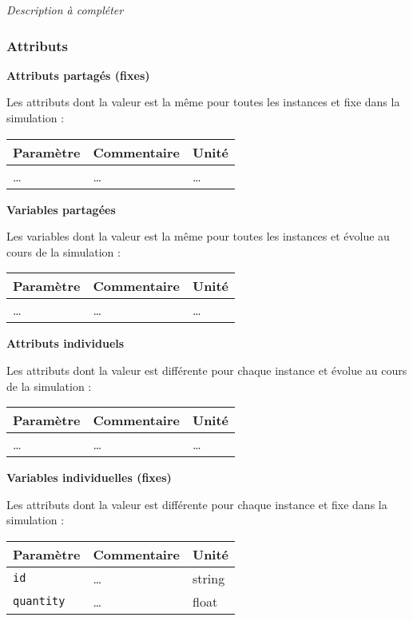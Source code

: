 \documentclass[
]{article}
\begin{document}
\emph{Description à compléter}

\subsubsection{Attributs}\label{attributs-3}

\textbf{Attributs partagés (fixes)}

Les attributs dont la valeur est la même pour toutes les instances et
fixe dans la simulation :

\begin{longtable}[]{@{}lll@{}}
\toprule\noalign{}
\textbf{Paramètre} & \textbf{Commentaire} & \textbf{Unité} \\
\midrule\noalign{}
\endhead
\bottomrule\noalign{}
\endlastfoot
\ldots{} & \ldots{} & \ldots{} \\
\end{longtable}

\textbf{Variables partagées}

Les variables dont la valeur est la même pour toutes les instances et
évolue au cours de la simulation :

\begin{longtable}[]{@{}lll@{}}
\toprule\noalign{}
\textbf{Paramètre} & \textbf{Commentaire} & \textbf{Unité} \\
\midrule\noalign{}
\endhead
\bottomrule\noalign{}
\endlastfoot
\ldots{} & \ldots{} & \ldots{} \\
\end{longtable}

\textbf{Attributs individuels}

Les attributs dont la valeur est différente pour chaque instance et
évolue au cours de la simulation :

\begin{longtable}[]{@{}lll@{}}
\toprule\noalign{}
\textbf{Paramètre} & \textbf{Commentaire} & \textbf{Unité} \\
\midrule\noalign{}
\endhead
\bottomrule\noalign{}
\endlastfoot
\ldots{} & \ldots{} & \ldots{} \\
\end{longtable}

\textbf{Variables individuelles (fixes)}

Les attributs dont la valeur est différente pour chaque instance et fixe
dans la simulation :

\begin{longtable}[]{@{}lll@{}}
\toprule\noalign{}
\textbf{Paramètre} & \textbf{Commentaire} & \textbf{Unité} \\
\midrule\noalign{}
\endhead
\bottomrule\noalign{}
\endlastfoot
\texttt{id} & \ldots{} & string \\
\texttt{quantity} & \ldots{} & float \\
\end{longtable}
\end{document}
